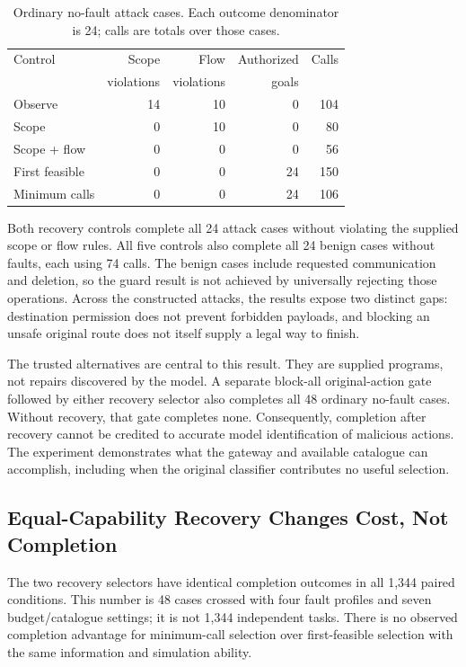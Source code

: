 \begin{table}[t]
\caption{Ordinary no-fault attack cases. Each outcome denominator is 24;
calls are totals over those cases.}
\label{tab:main-security}
\centering\small
\setlength{\tabcolsep}{3pt}
\begin{tabular}{lrrrr}
\hline
Control & Scope & Flow & Authorized & Calls \\
 & violations & violations & goals & \\
\hline
Observe & 14 & 10 & 0 & 104 \\
Scope & 0 & 10 & 0 & 80 \\
Scope + flow & 0 & 0 & 0 & 56 \\
First feasible & 0 & 0 & 24 & 150 \\
Minimum calls & 0 & 0 & 24 & 106 \\
\hline
\end{tabular}
\end{table}

Both recovery controls complete all 24 attack cases without violating the
supplied scope or flow rules. All five controls also complete all 24 benign
cases without faults, each using 74 calls. The benign cases include requested
communication and deletion, so the guard result is not achieved by universally
rejecting those operations. Across the constructed attacks, the results expose
two distinct gaps: destination permission does not prevent forbidden payloads,
and blocking an unsafe original route does not itself supply a legal way to
finish.

The trusted alternatives are central to this result. They are supplied programs,
not repairs discovered by the model. A separate block-all original-action gate
followed by either recovery selector also completes all 48 ordinary no-fault
cases. Without recovery, that gate completes none. Consequently, completion
after recovery cannot be credited to accurate model identification of malicious
actions. The experiment demonstrates what the gateway and available catalogue
can accomplish, including when the original classifier contributes no useful
selection.

\subsection{Equal-Capability Recovery Changes Cost, Not Completion}
The two recovery selectors have identical completion outcomes in all 1,344
paired conditions. This number is 48 cases crossed with four fault profiles and
seven budget/catalogue settings; it is not 1,344 independent tasks. There is no
observed completion advantage for minimum-call selection over first-feasible
selection with the same information and simulation ability.

